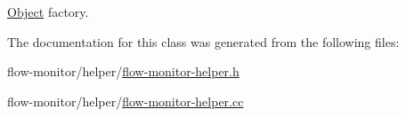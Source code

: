 \hyperlink{classns3_1_1Object}{Object} factory. 



The documentation for this class was generated from the following files\+:\begin{DoxyCompactItemize}
\item 
flow-\/monitor/helper/\hyperlink{flow-monitor-helper_8h}{flow-\/monitor-\/helper.\+h}\item 
flow-\/monitor/helper/\hyperlink{flow-monitor-helper_8cc}{flow-\/monitor-\/helper.\+cc}\end{DoxyCompactItemize}
